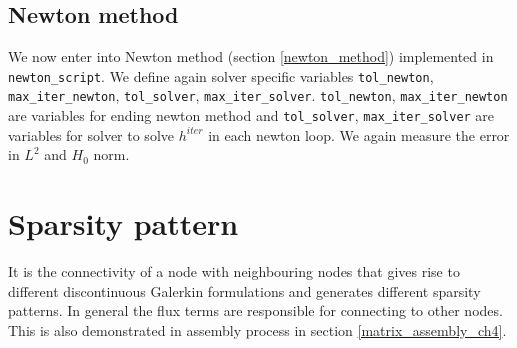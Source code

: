 \documentclass[a4paper,twoside,openright]{book}
\begin{document}
\subsection{Newton method}

We now enter into Newton method (section \ref{newton_method}) implemented in \verb|newton_script|. We define again solver specific variables \verb|tol_newton|, \verb|max_iter_newton|, \verb|tol_solver|, \verb|max_iter_solver|. \verb|tol_newton|, \verb|max_iter_newton| are variables for ending newton method and \verb|tol_solver|, \verb|max_iter_solver| are variables for solver to solve $h^{iter}$ in each newton loop. We again measure the error in $L^2$ and $H_0$ norm.\\

\section{Sparsity pattern}

It is the connectivity of a node with neighbouring nodes that gives rise to different discontinuous Galerkin formulations and generates different sparsity patterns. In general the flux terms are responsible for connecting to other nodes. This is also demonstrated in assembly process in section \ref{matrix_assembly_ch4}. \\
\end{document}
